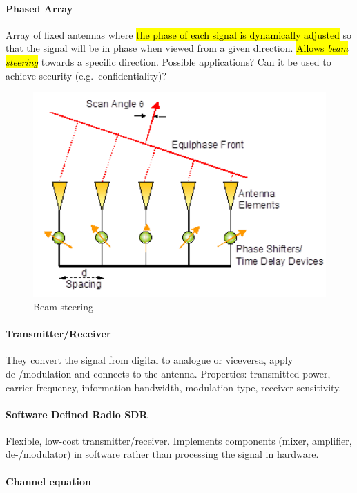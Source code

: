 \paragraph{Phased Array}
Array of fixed antennas where \hl{the phase of each signal is dynamically adjusted}
so that the signal will be in phase when viewed from a given direction. \hl{Allows
	\textit{beam steering}} towards a specific direction. Possible applications? Can
it be used to achieve security (e.g.\ confidentiality)?

\begin{figure}[h]
	\centering
	\includegraphics[scale=0.4]{images/1-beam-steering.png}
	\caption{Beam steering}%
	\label{fig:beam-steering}
\end{figure}

\paragraph{Transmitter/Receiver}
They convert the signal from digital to analogue or viceversa, apply de-/modulation and connects to the
antenna. Properties: transmitted power, carrier frequency,
information bandwidth, modulation type, receiver sensitivity.

\paragraph{Software Defined Radio SDR}
Flexible, low-cost transmitter/receiver. Implements components (mixer,
amplifier, de-/modulator) in software rather than processing the signal in
hardware.

\paragraph{Channel equation}

